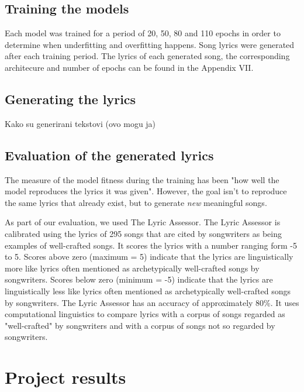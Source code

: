 \documentclass[conference]{IEEEtran}
\begin{document}
\subsection{Training the models}
Each model was trained for a period of 20, 50, 80 and 110 epochs in order to determine when underfitting and overfitting happens. 
Song lyrics were generated after each training period.
The lyrics of each generated song, the corresponding architecure and number of epochs can be found in the Appendix VII.

\subsection{Generating the lyrics}
Kako su generirani tekstovi (ovo mogu ja)

\subsection{Evaluation of the generated lyrics}
The measure of the model fitness during the training has been "how well the
model reproduces the lyrics it was given". However, the goal isn't to reproduce
the same lyrics that already exist, but to generate \textit{new} meaningful songs. 

As part of our evaluation, we used The Lyric Assessor.
The Lyric Assessor is calibrated using the lyrics of 295 songs that are cited by songwriters as being examples of well-crafted songs. It scores the lyrics with a number ranging form -5 to 5. 
Scores above zero (maximum = 5) indicate that the lyrics are linguistically more like lyrics often mentioned as archetypically well-crafted songs by songwriters.
Scores below zero (minimum = -5) indicate that the lyrics are linguistically less like lyrics often mentioned as archetypically well-crafted songs by songwriters.
The Lyric Assessor has an accuracy of approximately 80\%. It uses computational linguistics to compare lyrics with a corpus of songs regarded as "well-crafted" by songwriters and with a corpus of songs not so regarded by songwriters.

\section{Project results}
\end{document}
